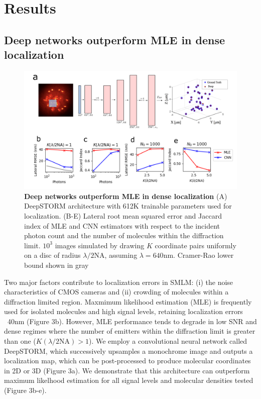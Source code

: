 \documentclass{ucetd}
\begin{document}
\clearpage
\section{Results}

\subsection{Deep networks outperform MLE in dense localization}


\begin{figure}
\includegraphics[width=15cm]{PSF2D.png}
\caption{\textbf{Deep networks outperform MLE in dense localization} (A) DeepSTORM architecture with 612K trainable parameters used for localization. (B-E) Lateral root mean squared error and Jaccard index of MLE and CNN estimators with respect to the incident photon count and the number of molecules within the diffraction limit. $10^3$ images simulated by drawing $K$ coordinate pairs uniformly on a disc of radius $\lambda/2\mathrm{NA}$, assuming $\lambda = 640\mathrm{nm}$. Cramer-Rao lower bound shown in gray}
\end{figure}


Two major factors contribute to localization errors in SMLM: (i) the noise characteristics of CMOS cameras and (ii) crowding of molecules within a diffraction limited region. Maxmimum likelihood estimation (MLE) is frequently used for isolated molecules and high signal levels, retaining localization errors ~40nm (Figure 3b). However, MLE performance tends to degrade in low SNR and dense regimes where the number of emitters within the diffraction limit is greater than one ($K(\lambda/2\mathrm{NA}) > 1$). We employ a convolutional neural network called DeepSTORM, which successively upsamples a monochrome image and outputs a localization map, which can be post-processed to produce molecular coordinates in 2D or 3D (Figure 3a).  We demonstrate that this architecture can outperform maximum likelhood estimation for all signal levels and molecular densities tested (Figure 3b-e).
\end{document}
